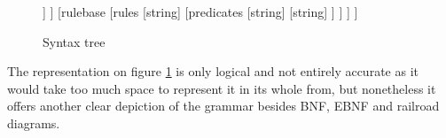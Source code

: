 \begin{figure}[!h]
	\centering
	\begin{forest}
		 [behavior
		 	[universe
				[symbol
					[string]
					[number]
					[number]
				]
			]
		 	[rulebase
				[rules
					[string]
					[predicates
						[string]
						[string]
					]
				]
			]
		 ]
	\end{forest}
	\caption{Syntax tree}
	\label{fig:tree}
\end{figure}

The representation on figure \ref{fig:tree} is only logical and not entirely accurate as it would take too much space to represent it in its whole from, but nonetheless it offers another clear depiction of the grammar besides BNF, EBNF and railroad diagrams.

